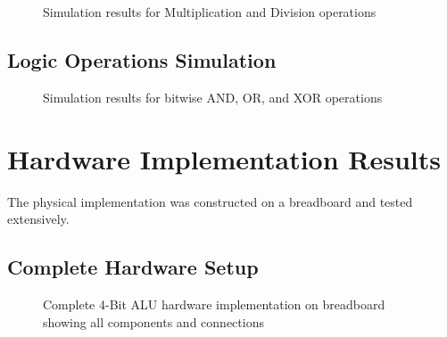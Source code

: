 \begin{figure}[h]
    \centering
    \caption{Simulation results for Multiplication and Division operations}
    \label{fig:sim-mult-div}
\end{figure}

\subsection{Logic Operations Simulation}

\begin{figure}[h]
    \centering
    \caption{Simulation results for bitwise AND, OR, and XOR operations}
    \label{fig:sim-logic}
\end{figure}

\section{Hardware Implementation Results}

The physical implementation was constructed on a breadboard and tested extensively.

\subsection{Complete Hardware Setup}

\begin{figure}[h]
    \centering
    \caption{Complete 4-Bit ALU hardware implementation on breadboard showing all components and connections}
    \label{fig:hardware-complete}
\end{figure}

